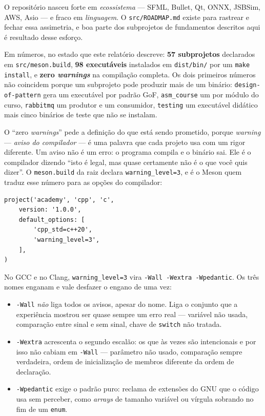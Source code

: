 O repositório nasceu forte em \emph{ecossistema} --- SFML, Bullet, Qt, ONNX,
JSBSim, AWS, Asio --- e fraco em \emph{linguagem}. O \texttt{src/ROADMAP.md}
existe para rastrear e fechar essa assimetria, e boa parte dos subprojetos de
fundamentos descritos aqui é resultado desse esforço.

Em números, no estado que este relatório descreve: \textbf{57 subprojetos}
declarados em \texttt{src/meson.build}, \textbf{98 executáveis} instalados em
\texttt{dist/bin/} por um \texttt{make install}, e \textbf{zero \emph{warnings}}
na compilação completa. Os dois primeiros números não coincidem porque um
subprojeto pode produzir mais de um binário: \texttt{design-of-pattern} gera um
executável por padrão GoF, \texttt{asm\_course} um por módulo do curso,
\texttt{rabbitmq} um produtor e um consumidor, \texttt{testing} um executável
didático mais cinco binários de teste que não se instalam.

O ``zero \emph{warnings}'' pede a definição do que está sendo prometido, porque
\emph{warning} --- \emph{aviso do compilador} --- é uma palavra que cada projeto
usa com um rigor diferente. Um aviso não é um erro: o programa compila e o
binário sai. Ele é o compilador dizendo ``isto é legal, mas quase certamente não
é o que você quis dizer''. O \texttt{meson.build} da raiz declara
\texttt{warning\_level=3}, e é o Meson quem traduz esse número para as opções do
compilador:

\begin{lstlisting}[style=bt, language=Meson,
    caption={O nível de aviso, declarado uma vez para o repositório inteiro, em
             \texttt{meson.build} da raiz.}]
project('academy', 'cpp', 'c',
    version: '1.0.0',
    default_options: [
        'cpp_std=c++20',
        'warning_level=3',
    ],
)
\end{lstlisting}

No GCC e no Clang, \texttt{warning\_level=3} vira \texttt{-Wall -Wextra
-Wpedantic}. Os três nomes enganam e vale desfazer o engano de uma vez:

\begin{itemize}
    \item \texttt{-Wall} \emph{não} liga todos os avisos, apesar do nome. Liga o
          conjunto que a experiência mostrou ser quase sempre um erro real ---
          variável não usada, comparação entre sinal e sem sinal, chave de
          \texttt{switch} não tratada.
    \item \texttt{-Wextra} acrescenta o segundo escalão: os que às vezes são
          intencionais e por isso não cabiam em \texttt{-Wall} --- parâmetro não
          usado, comparação sempre verdadeira, ordem de inicialização de
          membros diferente da ordem de declaração.
    \item \texttt{-Wpedantic} exige o padrão puro: reclama de extensões do GNU
          que o código usa sem perceber, como \emph{arrays} de tamanho variável
          ou vírgula sobrando no fim de um \texttt{enum}.
\end{itemize}

